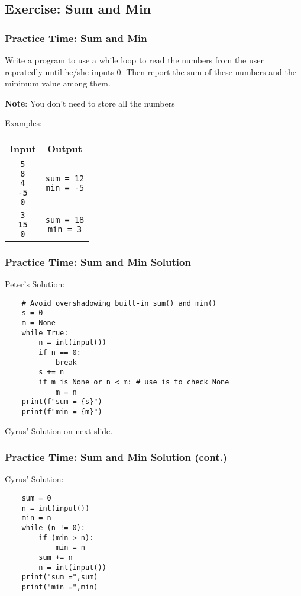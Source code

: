 \documentclass{beamer}
\begin{document}
\subsection{Exercise: Sum and Min}
\begin{frame}[fragile]
    \frametitle{Practice Time: Sum and Min}

    Write a program to use a while loop to read the numbers
    from the user repeatedly until he/she inputs 0.
    Then report the sum of these numbers and the minimum value among them.

    \textbf{Note}: You don't need to store all the numbers

    Examples:

    \begin{tabular}{|c|c|}
        \hline
        Input & Output                          \\ \hline
        \makecell[tl]{\texttt{5}                \\ \texttt{8} \\ \texttt{4} \\ \texttt{-5} \\ \texttt{0}}
              & \makecell[tl]{\texttt{sum = 12} \\ \texttt{min = -5}} \\ \hline
        \makecell[tl]{\texttt{3}                \\ \texttt{15} \\ \texttt{0}}
              & \makecell[tl]{\texttt{sum = 18} \\ \texttt{min = 3}} \\ \hline
    \end{tabular}
\end{frame}
\begin{frame}[fragile]
    \frametitle{Practice Time: Sum and Min Solution}

    Peter's Solution:
    \begin{verbatim}
    # Avoid overshadowing built-in sum() and min()
    s = 0
    m = None
    while True:
        n = int(input())
        if n == 0:
            break
        s += n
        if m is None or n < m: # use is to check None
            m = n
    print(f"sum = {s}")
    print(f"min = {m}")
    \end{verbatim}

    Cyrus' Solution on next slide.
\end{frame}

\begin{frame}[fragile]
    \frametitle{Practice Time: Sum and Min Solution (cont.)}

    Cyrus' Solution:
    \begin{verbatim}
    sum = 0
    n = int(input())
    min = n
    while (n != 0):
        if (min > n):
            min = n
        sum += n
        n = int(input())
    print("sum =",sum)
    print("min =",min)
    \end{verbatim}
\end{frame}
\end{document}
